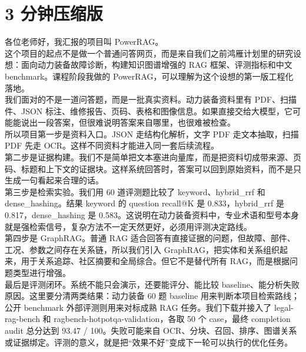 \documentclass[11pt, a4paper]{ctexart}
\begin{document}
\section*{3 分钟压缩版}

各位老师好，我汇报的项目叫 PowerRAG。\\

这个项目的起点不是做一个普通问答网页，而是来自我们之前鸿雁计划里的研究设想：面向动力装备故障诊断，构建知识图谱增强的 RAG 框架、评测指标和中文 benchmark。课程阶段我做的 PowerRAG，可以理解为这个设想的第一版工程化落地。\\

我们面对的不是一道问答题，而是一批真实资料。动力装备资料里有 PDF、扫描件、JSON 标注、维修报告、页码、表格和图像信息。如果直接交给大模型，它可能能说出一段答案，但很难说明答案来自哪里，也很难被检查。\\

所以项目第一步是资料入口。JSON 走结构化解析，文字 PDF 走文本抽取，扫描 PDF 先走 OCR。这样不同资料才能进入同一套后续流程。\\

第二步是证据构建。我们不是简单把文本塞进向量库，而是把资料切成带来源、页码、标题和上下文的证据块。这样系统回答时，答案可以回到原始资料，而不是只生成一句看起来合理的话。\\

第三步是检索实验。我们用 60 道评测题比较了 keyword、hybrid\_rrf 和 dense\_hashing。结果 keyword 的 question recall@K 是 0.833，hybrid\_rrf 是 0.817，dense\_hashing 是 0.583。这说明在动力装备资料中，专业术语和型号本身就是强检索信号，复杂方法不一定天然更好，必须用评测决定路线。\\

第四步是 GraphRAG。普通 RAG 适合回答有直接证据的问题，但故障、部件、工况、参数之间存在关系链，所以我们引入 GraphRAG，把实体和关系组织起来，用于关系追踪、社区摘要和全局综合。但它不是替代所有 RAG，而是根据问题类型进行增强。\\

最后是评测闭环。系统不能只会演示，还要能评分、能比较 baseline、能分析失败原因。这里要分清两类结果：动力装备 60 题 baseline 用来判断本项目检索路线；公开 benchmark 外部评测则用来对标成熟 RAG 任务。我们下载并接入了 legal-rag-bench 和 ragbench-hotpotqa-validation，各取 50 个 case，最终 completion audit 总分达到 93.47 / 100。失败可能来自 OCR、分块、召回、排序、图谱关系或证据绑定。评测的意义，就是把“效果不好”变成下一轮可以执行的优化任务。\\
\end{document}
